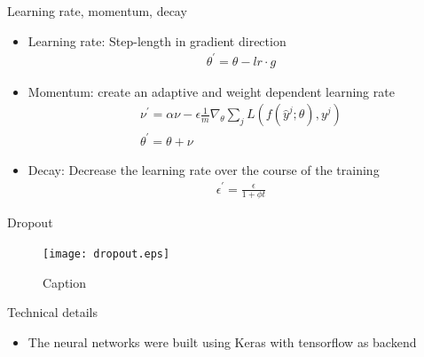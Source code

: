 \begin{frame}{Learning rate, momentum, decay}
\begin{itemize}
    \item Learning rate: Step-length in gradient direction
    \begin{align}
    \theta^{\prime} = \theta - lr \cdot g
    \end{align}
    \item Momentum: create an adaptive and weight dependent learning rate
    \begin{align}
    \nu^{\prime} = \alpha \nu - \epsilon \frac{1}{m} \nabla_{\theta} \sum_j L(f(\hat{y}^j; \theta), y^j)\\
    \theta^{\prime} = \theta + \nu
    \end{align}
    \item Decay: Decrease the learning rate over the course of the training
    \begin{align}
    \epsilon^{\prime} = \frac{\epsilon}{1 + \phi t}
    \end{align}
\end{itemize}
\end{frame}


\begin{frame}{Dropout}
\begin{figure}
    \centering
    \texttt{[image: dropout.eps]}
    \caption{Caption}
    \label{fig:my_label}
\end{figure}
\end{frame}

\begin{frame}{Technical details}
    \begin{itemize}
        \item The neural networks were built using Keras \cite{chollet2015keras} with tensorflow \cite{tensorflow2015-whitepaper} as backend
    \end{itemize}
\end{frame}


